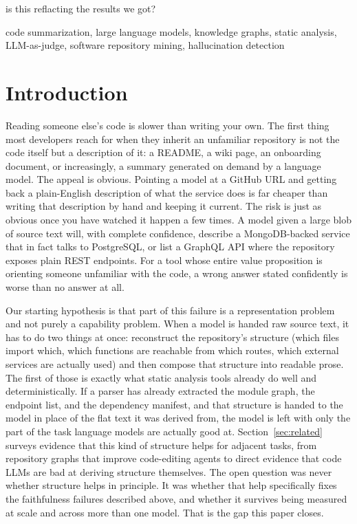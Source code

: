 is this reflacting the results we got?\documentclass[conference]{IEEEtran}
\begin{document}
\begin{IEEEkeywords}
code summarization, large language models, knowledge graphs, static analysis, LLM-as-judge,
software repository mining, hallucination detection
\end{IEEEkeywords}

\section{Introduction}
\label{sec:intro}

Reading someone else's code is slower than writing your own. The first thing most developers
reach for when they inherit an unfamiliar repository is not the code itself but a description
of it: a README, a wiki page, an onboarding document, or increasingly, a summary generated on
demand by a language model. The appeal is obvious. Pointing a model at a GitHub URL and getting
back a plain-English description of what the service does is far cheaper than writing that
description by hand and keeping it current. The risk is just as obvious once you have watched
it happen a few times. A model given a large blob of source text will, with complete
confidence, describe a MongoDB-backed service that in fact talks to PostgreSQL, or list a
GraphQL API where the repository exposes plain REST endpoints. For a tool whose entire value
proposition is orienting someone unfamiliar with the code, a wrong answer stated confidently is
worse than no answer at all.

Our starting hypothesis is that part of this failure is a representation problem and not purely
a capability problem. When a model is handed raw source text, it has to do two things at once:
reconstruct the repository's structure (which files import which, which functions are reachable
from which routes, which external services are actually used) and then compose that structure
into readable prose. The first of those is exactly what static analysis tools already do well
and deterministically. If a parser has already extracted the module graph, the endpoint list,
and the dependency manifest, and that structure is handed to the model in place of the flat text
it was derived from, the model is left with only the part of the task language models are
actually good at. Section~\ref{sec:related} surveys evidence that this kind of structure helps
for adjacent tasks, from repository graphs that improve code-editing agents to direct evidence
that code LLMs are bad at deriving structure themselves. The open question was never whether
structure helps in principle. It was whether that help specifically fixes the faithfulness
failures described above, and whether it survives being measured at scale and across more than
one model. That is the gap this paper closes.
\end{document}
